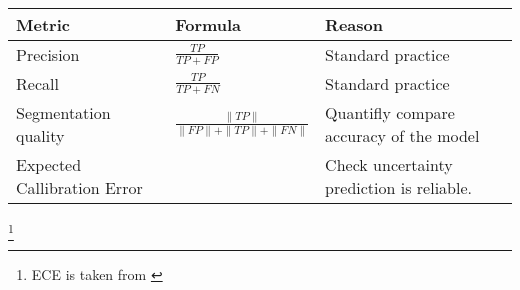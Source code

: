 \begin{table}[]
    \begin{tabular}{l|l|l}
        Metric                      & Formula                                   & Reason                                     \\
        \hline
        Precision                   & $\frac{TP}{TP + FP}$                      & Standard practice                          \\
        Recall                      & $\frac{TP}{TP + FN}$                      & Standard practice                          \\
        Segmentation quality        & $\frac{\|TP\|}{\|FP\| + \|TP\| + \|FN\|}$ & Quantifly compare accuracy of the model    \\
        Expected Callibration Error &                                           & Check uncertainty prediction is reliable.
    \end{tabular}
\end{table}

\footnote[1]{ECE is taken from \cite{guo2017calibration}}